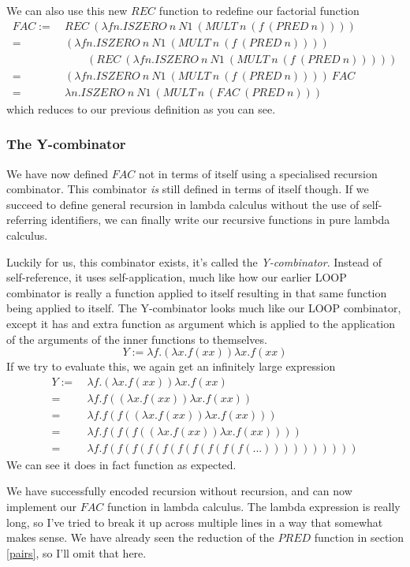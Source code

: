 \documentclass[11pt]{article}
\begin{document}
We can also use this new \(REC\) function to redefine our factorial function
\begin{align*}
	FAC:=\ &REC\ (\lambda fn.ISZERO\ n\ N1\ (MULT\ n\ (f\ (PRED\ n))))\\
	=\ &(\lambda fn.ISZERO\ n\ N1\ (MULT\ n\ (f\ (PRED\ n))))\\
	&\qquad(REC\ (\lambda fn.ISZERO\ n\ N1\ (MULT\ n\ (f\ (PRED\ n)))))\\
	=\ &(\lambda fn.ISZERO\ n\ N1\ (MULT\ n\ (f\ (PRED\ n))))\ FAC\\
	=\ &\lambda n.ISZERO\ n\ N1\ (MULT\ n\ (FAC\ (PRED\ n)))
\end{align*}
which reduces to our previous definition as you can see.

\subsubsection{The Y-combinator}

We have now defined \(FAC\) not in terms of itself using a specialised
recursion combinator. This combinator \emph{is} still defined in terms of
itself though. If we succeed to define general recursion in lambda calculus
without the use of self-referring identifiers, we can finally write our
recursive functions in pure lambda calculus.

Luckily for us, this combinator exists, it's called the \emph{Y-combinator}.
Instead of self-reference, it uses self-application, much like how our earlier
LOOP combinator is really a function applied to itself resulting in that same
function being applied to itself. The Y-combinator looks much like our LOOP
combinator, except it has and extra function as argument which is applied to
the application of the arguments of the inner functions to themselves.
\[Y:=\lambda f.(\lambda x.f(xx))\lambda x.f(xx)\]
If we try to evaluate this, we again get an infinitely large expression
\begin{align*}
	Y:=\ &\lambda f.(\lambda x.f(xx))\lambda x.f(xx)\\
	=\ &\lambda f.f((\lambda x.f(xx))\lambda x.f(xx))\\
	=\ &\lambda f.f(f((\lambda x.f(xx))\lambda x.f(xx)))\\
	=\ &\lambda f.f(f(f((\lambda x.f(xx))\lambda x.f(xx))))\\
	=\ &\lambda f.f(f(f(f(f(f(f(f(f(f(...))))))))))
\end{align*}
We can see it does in fact function as expected.

We have successfully encoded recursion without recursion, and can now implement
our \(FAC\) function in lambda calculus. The lambda expression is really long,
so I've tried to break it up across multiple lines in a way that somewhat makes
sense. We have already seen the reduction of the \(PRED\) function in section
\ref{pairs}, so I'll omit that here.
\end{document}
